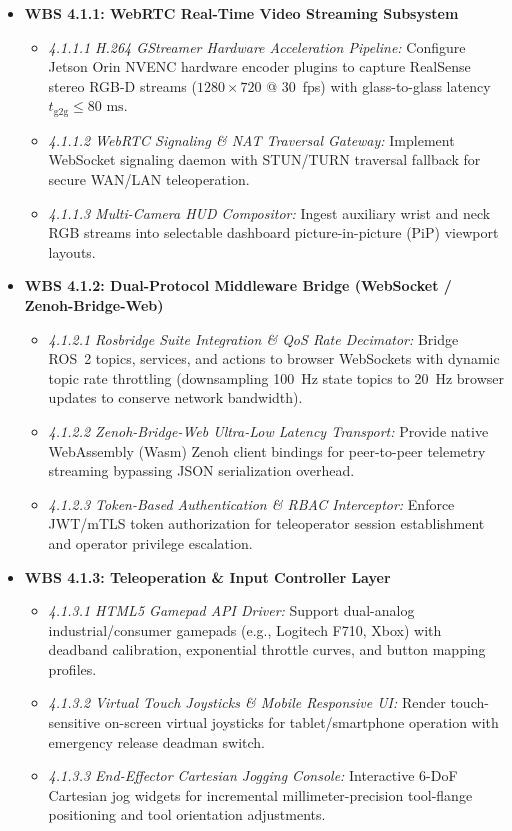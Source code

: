 \documentclass[10pt,a4paper]{article}
\begin{document}
\begin{itemize}[leftmargin=1.5em]
    \item \textbf{WBS 4.1.1: WebRTC Real-Time Video Streaming Subsystem}
    \begin{itemize}[leftmargin=1.2em]
        \item \emph{4.1.1.1 H.264 GStreamer Hardware Acceleration Pipeline:} Configure Jetson Orin NVENC hardware encoder plugins to capture RealSense stereo RGB-D streams ($1280\times720$ @ 30~fps) with glass-to-glass latency $t_{\text{g2g}} \le 80\text{ ms}$.
        \item \emph{4.1.1.2 WebRTC Signaling \& NAT Traversal Gateway:} Implement WebSocket signaling daemon with STUN/TURN traversal fallback for secure WAN/LAN teleoperation.
        \item \emph{4.1.1.3 Multi-Camera HUD Compositor:} Ingest auxiliary wrist and neck RGB streams into selectable dashboard picture-in-picture (PiP) viewport layouts.
    \end{itemize}

    \item \textbf{WBS 4.1.2: Dual-Protocol Middleware Bridge (WebSocket / Zenoh-Bridge-Web)}
    \begin{itemize}[leftmargin=1.2em]
        \item \emph{4.1.2.1 Rosbridge Suite Integration \& QoS Rate Decimator:} Bridge ROS~2 topics, services, and actions to browser WebSockets with dynamic topic rate throttling (downsampling 100~Hz state topics to 20~Hz browser updates to conserve network bandwidth).
        \item \emph{4.1.2.2 Zenoh-Bridge-Web Ultra-Low Latency Transport:} Provide native WebAssembly (Wasm) Zenoh client bindings for peer-to-peer telemetry streaming bypassing JSON serialization overhead.
        \item \emph{4.1.2.3 Token-Based Authentication \& RBAC Interceptor:} Enforce JWT/mTLS token authorization for teleoperator session establishment and operator privilege escalation.
    \end{itemize}

    \item \textbf{WBS 4.1.3: Teleoperation \& Input Controller Layer}
    \begin{itemize}[leftmargin=1.2em]
        \item \emph{4.1.3.1 HTML5 Gamepad API Driver:} Support dual-analog industrial/consumer gamepads (e.g., Logitech F710, Xbox) with deadband calibration, exponential throttle curves, and button mapping profiles.
        \item \emph{4.1.3.2 Virtual Touch Joysticks \& Mobile Responsive UI:} Render touch-sensitive on-screen virtual joysticks for tablet/smartphone operation with emergency release deadman switch.
        \item \emph{4.1.3.3 End-Effector Cartesian Jogging Console:} Interactive 6-DoF Cartesian jog widgets for incremental millimeter-precision tool-flange positioning and tool orientation adjustments.
    \end{itemize}


\end{itemize}
\end{document}

